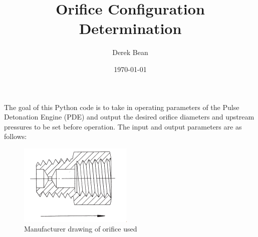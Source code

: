 \documentclass{article}
\title{Orifice Configuration Determination}
\author{Derek Bean}
\date{\today}
\begin{document}
\maketitle
\printnomenclature
The goal of this Python code is to take in operating parameters of the Pulse Detonation Engine (PDE) and output the desired orifice diameters and upstream pressures to be set before operation. The input and output parameters are as follows:
    \begin{figure}[h]
        \centering
        \includegraphics{Orifice_Image}
        \caption{Manufacturer drawing of orifice used}
        \label{fig:orifice}
    \end{figure}
    
\end{document}
